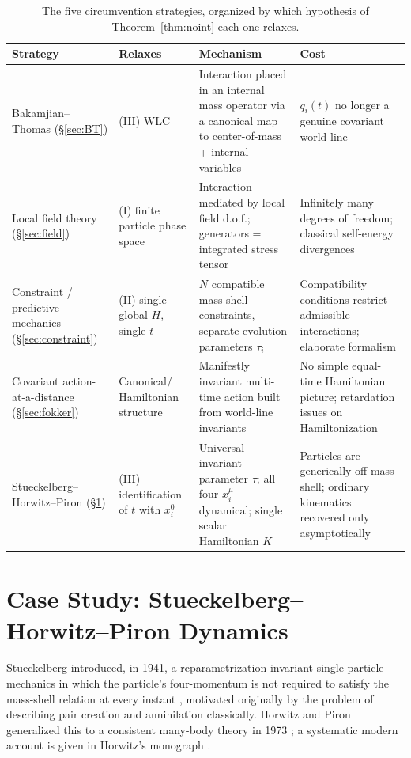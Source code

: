 \documentclass[11pt]{article}
\begin{document}
\begin{table}[h]
\centering
\small
\begin{tabular}{@{}p{2.9cm}p{2.7cm}p{4.4cm}p{4.1cm}@{}}
\toprule
\textbf{Strategy} & \textbf{Relaxes} & \textbf{Mechanism} & \textbf{Cost} \\
\midrule
Bakamjian--Thomas (\S\ref{sec:BT}) & (III) WLC &
Interaction placed in an internal mass operator via a canonical map to center-of-mass + internal variables &
$q_i(t)$ no longer a genuine covariant world line \\[4pt]
Local field theory (\S\ref{sec:field}) & (I) finite particle phase space &
Interaction mediated by local field d.o.f.; generators = integrated stress tensor &
Infinitely many degrees of freedom; classical self-energy divergences \\[4pt]
Constraint / predictive mechanics (\S\ref{sec:constraint}) & (II) single global $H$, single $t$ &
$N$ compatible mass-shell constraints, separate evolution parameters $\tau_i$ &
Compatibility conditions restrict admissible interactions; elaborate formalism \\[4pt]
Covariant action-at-a-distance (\S\ref{sec:fokker}) & Canonical/ Hamiltonian structure &
Manifestly invariant multi-time action built from world-line invariants &
No simple equal-time Hamiltonian picture; retardation issues on Hamiltonization \\[4pt]
Stueckelberg--Horwitz--Piron (\S\ref{sec:shp}) & (III) identification of $t$ with $x_i^0$ &
Universal invariant parameter $\tau$; all four $x_i^\mu$ dynamical; single scalar Hamiltonian $K$ &
Particles are generically off mass shell; ordinary kinematics recovered only asymptotically \\
\bottomrule
\end{tabular}
\caption{The five circumvention strategies, organized by which hypothesis of Theorem~\ref{thm:noint} each one relaxes.}
\label{tab:summary}
\end{table}

\section{Case Study: Stueckelberg--Horwitz--Piron Dynamics}
\label{sec:shp}

Stueckelberg introduced, in 1941, a reparametrization-invariant single-particle mechanics in which the particle's four-momentum is not required to satisfy the mass-shell relation at every instant \cite{Stueckelberg1941}, motivated originally by the problem of describing pair creation and annihilation classically. Horwitz and Piron generalized this to a consistent many-body theory in 1973 \cite{HorwitzPiron1973}; a systematic modern account is given in Horwitz's monograph \cite{Horwitz2015}.
\end{document}
